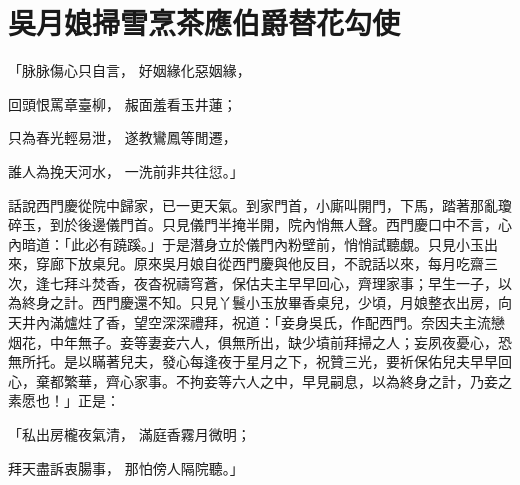 %

\chapter{吳月娘掃雪烹茶\KG 應伯爵替花勾使}

「脉脉傷心只自言， 好姻緣化惡姻緣，

回頭恨罵章臺柳， 赧面羞看玉井蓮；

只為春光輕易泄， 遂教鸞鳳等閒遷，

誰人為挽天河水， 一洗前非共往愆。」

話說西門慶從院中歸家，已一更天氣。到家門首，小廝叫開門，下馬，踏著那亂瓊碎玉，到於後邊儀門首。只見儀門半掩半開，院內悄無人聲。西門慶口中不言，心內暗道：「此必有蹺蹊。」于是潛身立於儀門內粉壁前，悄悄試聽覷。只見小玉出來，穿廊下放桌兒。原來吳月娘自從西門慶與他反目，不說話以來，每月吃齋三次，逢七拜斗焚香，夜杳祝禱穹蒼，保估夫主早早回心，齊理家事；早生一子，以為終身之計。西門慶還不知。只見丫鬟小玉放畢香桌兒，少頃，月娘整衣出房，向天井內滿爐炷了香，望空深深禮拜，祝道：「妾身吳氏，作配西門。奈因夫主流戀烟花，中年無子。妾等妻妾六人，俱無所出，缺少墳前拜掃之人；妄夙夜憂心，恐無所托。是以瞞著兒夫，發心每逢夜于星月之下，祝贊三光，要祈保佑兒夫早早回心，棄都繁華，齊心家事。不拘妾等六人之中，早見嗣息，以為終身之計，乃妾之素愿也！」正是：

「私出房櫳夜氣清， 滿庭香霧月微明；

拜天盡訴衷腸事， 那怕傍人隔院聽。」


